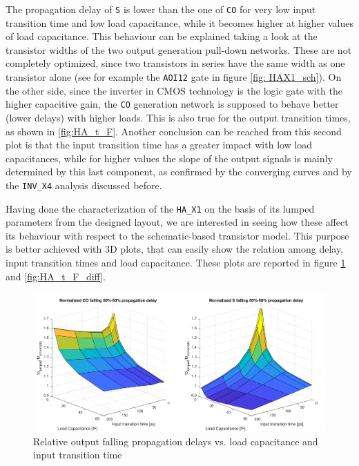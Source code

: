 \documentclass[a4paper]{article}
\newcommand{\inv}{\texttt{INV\_X4}\xspace}
\newcommand{\ha}{\texttt{HA\_X1}\xspace}
\begin{document}
The propagation delay of \texttt{S} is lower than the one of \texttt{CO} for very low input transition time and low load capacitance, while it becomes higher at higher values of load capacitance. This behaviour can be explained taking a look at the transistor widths of the two output generation pull-down networks. These are not completely optimized, since two transistors in series have the same width as one transistor alone (see for example the \texttt{AOI12} gate in figure \ref{fig: HAX1_sch}). On the other side, since the inverter in CMOS technology is the logic gate with the higher capacitive gain, the \texttt{CO} generation network is supposed to behave better (lower delays) with higher loads. This is also true for the output transition times, as shown in \ref{fig:HA_t_F}. Another conclusion can be reached from this second plot is that the input transition time has a greater impact with low load capacitances, while for higher values the slope of the output signals is mainly determined by this last component, as confirmed by the converging curves and by the \inv analysis discussed before.

Having done the characterization of the \ha on the basis of its lumped parameters from the designed layout, we are interested in seeing how these affect its behaviour with respect to the schematic-based transistor model. This purpose is better achieved with 3D plots, that can easily show the relation among delay, input transition times and load capacitance. These plots are reported in figure \ref{fig:HA_tp_L_diff} and \ref{fig:HA_t_F_diff}.

\begin{figure}[ht]
	\includegraphics[width=\linewidth]{Images/HA/tp_L_diff_crop.pdf}
	\caption{Relative output falling propagation delays vs. load capacitance and input transition time}
	\label{fig:HA_tp_L_diff}
\end{figure}
\end{document}
